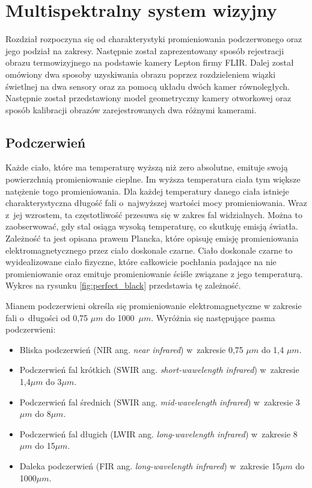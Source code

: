 \chapter{Multispektralny system wizyjny}
\label{cha:multispectral}

Rozdział rozpoczyna się od charakterystyki promieniowania podczerwonego oraz jego podział na zakresy. Następnie został zaprezentowany sposób rejestracji obrazu termowizyjnego na podstawie kamery Lepton firmy FLIR. Dalej został omówiony dwa sposoby uzyskiwania obrazu poprzez rozdzieleniem wiązki świetlnej na dwa sensory oraz za pomocą układu dwóch kamer równoległych. Następnie został przedstawiony model geometryczny kamery otworkowej oraz sposób kalibracji obrazów zarejestrowanych dwa różnymi kamerami.
 
\section{Podczerwień}

Każde ciało, które ma temperaturę wyższą niż zero absolutne, emituje swoją powierzchnią promieniowanie cieplne. Im wyższa temperatura ciała tym większe natężenie togo promieniowania.
Dla każdej temperatury danego ciała istnieje charakterystyczna długość fali o~najwyższej wartości mocy promieniowania. 
Wraz z~jej wzrostem, ta częstotliwość przesuwa się w zakres fal widzialnych.
Można to zaobserwować, gdy stal osiąga wysoką temperaturę, co skutkuję emisją światła.
Zależność ta jest opisana prawem Plancka, które opisuję emisję promieniowania elektromagnetycznego przez ciało doskonale czarne.
Ciało doskonale czarne to wyidealizowane ciało fizyczne, które całkowicie pochłania padające na nie promieniowanie oraz emituje promieniowanie ściśle związane z jego temperaturą.
Wykres na rysunku \ref{fig:perfect_black} przedstawia tę zależność.

Mianem podczerwieni określa się promieniowanie elektromagnetyczne w zakresie fali o~długości od 0,75 $\mu m$ do 1000~$\mu m$. Wyróżnia się następujące pasma podczerwieni:
\begin{itemize}
\item Bliska podczerwień (NIR ang. \textit{near infrared}) w~zakresie 0,75 $\mu m$ do 1,4 $\mu m$.
\item Podczerwień fal krótkich (SWIR ang. \textit{short-wawelength infrared}) w~zakresie 1,4$\mu m$ do 3$\mu m$.
\item Podczerwień fal średnich (SWIR ang. \textit{mid-wavelength infrared}) w~zakresie 3$\mu m$ do 8$\mu m$.
\item Podczerwień fal długich (LWIR ang. \textit{long-wavelength infrared}) w~zakresie 8$\mu m$ do 15$\mu m$.
\item Daleka podczerwień (FIR ang. \textit{long-wavelength infrared}) w~zakresie 15$\mu m$ do 1000$\mu m$.
\end{itemize}

